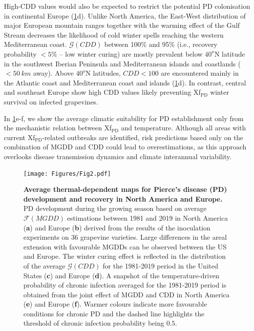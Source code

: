     High-CDD values would also be expected to restrict the potential PD
    colonisation in continental Europe (\cref{fig2}d). Unlike North America,
    the
    East-West distribution of major European mountain ranges together with the
    warming effect of the Gulf Stream decreases the likelihood of cold winter
    spells reaching the western Mediterranean coast. $\mathcal{G}(CDD)$ between
    100\% and 95\% (i.e., recovery probability $<5\%$ -- low winter curing) are
    mostly prevalent below $40^o$N latitude in the southwest Iberian Peninsula
    and
    Mediterranean islands and coastlands ($<\SI{50}{km}$ away). Above $40^o$N
    latitudes, $CDD < 100$ are encountered mainly in the Atlantic coast and
    Mediterranean coast and islands (\cref{fig2}d). In contrast, central and
    southeast Europe show high CDD values likely preventing Xf$_{\textrm{PD}}$
    winter survival on infected grapevines.

    In \cref{fig2}e-f, we show the average climatic suitability for PD
    establishment only from the mechanistic relation between Xf$_{\textrm{PD}}$
    and
    temperature. Although all areas with current Xf$_{\textrm{PD}}$-related
    outbreaks are identified, risk predictions based only on the combination of
    MGDD and CDD could lead to overestimations, as this approach overlooks
    disease
    transmission dynamics and climate interannual variability.

    \begin{figure}[H]
        \centering
        \texttt{[image: Figures/Fig2.pdf]}
        \caption{\textbf{Average thermal-dependent maps for Pierce's disease
                (PD)
                development and recovery in North America and Europe.} PD
            development during
            the growing season based on average $\mathcal{F}(MGDD)$ estimations
            between
            1981 and 2019 in North America (\textbf{a}) and Europe (\textbf{b})
            derived
            from the results of the inoculation experiments on 36 grapevine
            varieties.
            Large differences in the areal extension with favourable MGDDs can
            be observed
            between the US and Europe. The winter curing effect is reflected in
            the
            distribution of the average $\mathcal{G}(CDD)$ for the 1981-2019
            period in the
            United States (\textbf{c}) and Europe (\textbf{d}). A snapshot of
            the
            temperature-driven probability of chronic infection averaged for
            the 1981-2019
            period is obtained from the joint effect of MGDD and CDD in North
            America
            (\textbf{e}) and Europe (\textbf{f}). Warmer colours indicate more
            favourable
            conditions for chronic PD and the dashed line highlights the
            threshold of
            chronic infection probability being $0.5$.}
        \label{fig2}
    \end{figure}

